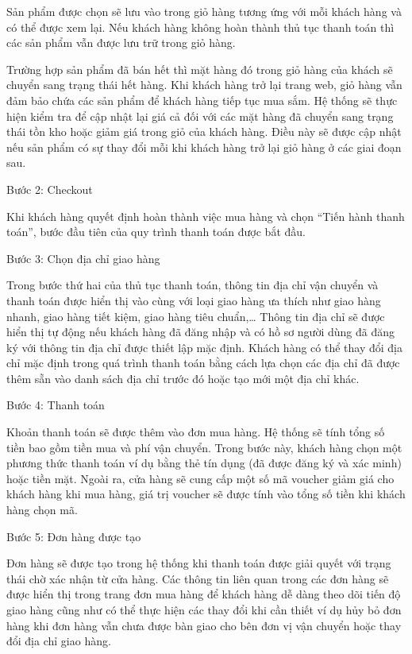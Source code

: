 \documentclass[12pt,a4paper,2sides]{report}
\begin{document}
Sản phẩm được chọn sẽ lưu vào trong giỏ hàng tương ứng với mỗi khách hàng và có thể được xem lại. Nếu khách hàng không hoàn thành thủ tục thanh toán thì các sản phẩm vẫn được lưu trữ trong giỏ hàng.

Trường hợp sản phẩm đã bán hết thì mặt hàng đó trong giỏ hàng của khách sẽ chuyển sang trạng thái hết hàng. Khi khách hàng trở lại trang web, giỏ hàng vẫn đảm bảo chứa các sản phẩm để khách hàng tiếp tục mua sắm. Hệ thống sẽ thực hiện kiểm tra để cập nhật lại giá cả đối với các mặt hàng đã chuyển sang trạng thái tồn kho hoặc giảm giá trong giỏ của khách hàng. Điều này sẽ được cập nhật nếu sản phẩm có sự thay đổi mỗi khi khách hàng trở lại giỏ hàng ở các giai đoạn sau.

Bước 2: Checkout 

Khi khách hàng quyết định hoàn thành việc mua hàng và chọn “Tiến hành thanh toán”, bước đầu tiên của quy trình thanh toán được bắt đầu.

Bước 3: Chọn địa chỉ giao hàng

Trong bước thứ hai của thủ tục thanh toán, thông tin địa chỉ vận chuyển và thanh toán được hiển thị vào cùng với loại giao hàng ưa thích như giao hàng nhanh, giao hàng tiết kiệm, giao hàng tiêu chuẩn,… Thông tin địa chỉ sẽ được hiển thị tự động nếu khách hàng đã đăng nhập và có hồ sơ người dùng đã đăng ký với thông tin địa chỉ được thiết lập mặc định. Khách hàng có thể thay đổi địa chỉ mặc định trong quá trình thanh toán bằng cách lựa chọn các địa chỉ đã được thêm sẵn vào danh sách địa chỉ trước đó hoặc tạo mới một địa chỉ khác.

Bước 4: Thanh toán

Khoản thanh toán sẽ được thêm vào đơn mua hàng. Hệ thống sẽ tính tổng số tiền bao gồm tiền mua và phí vận chuyển. Trong bước này, khách hàng chọn một phương thức thanh toán ví dụ bằng thẻ tín dụng (đã được đăng ký và xác minh) hoặc tiền mặt. Ngoài ra, cửa hàng sẽ cung cấp một số mã voucher giảm giá cho khách hàng khi mua hàng, giá trị voucher sẽ được tính vào tổng số tiền khi khách hàng chọn mã.

Bước 5: Đơn hàng được tạo

Đơn hàng sẽ được tạo trong hệ thống khi thanh toán được giải quyết với trạng thái chờ xác nhận từ cửa hàng. Các thông tin liên quan trong các đơn hàng sẽ được hiển thị trong trang đơn mua hàng để khách hàng dễ dàng theo dõi tiến độ giao hàng cũng như có thể thực hiện các thay đổi khi cần thiết ví dụ hủy bỏ đơn hàng khi đơn hàng vẫn chưa được bàn giao cho bên đơn vị vận chuyển hoặc thay đổi địa chỉ giao hàng.
\end{document}
